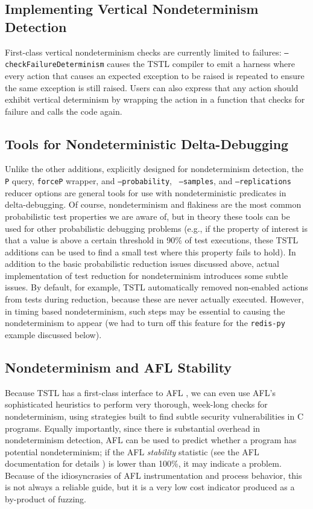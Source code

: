 \subsection{Implementing Vertical Nondeterminism Detection}

First-class vertical nondeterminism checks are currently
limited to failures:  {\tt --checkFailureDeterminism} causes the TSTL
compiler to emit a harness where every action that causes an expected
exception to be raised is repeated to ensure the same exception is
still raised.  Users can also express that any action should exhibit
vertical determinism by wrapping the action in a function that checks
for failure and calls the code again.

\subsection{Tools for Nondeterministic Delta-Debugging}

Unlike the other additions, explicitly designed for nondeterminism
detection, the {\tt P} query, {\tt forceP} wrapper, and {\tt --probability}, {\tt
  --samples}, and {\tt --replications} reducer options are general
tools for use with nondeterministic predicates in delta-debugging.  Of
course, nondeterminism and flakiness are the most common probabilistic
test properties we are aware of, but in theory these tools can be used
for other probabilistic debugging problems (e.g., if the property of
interest is that a value is above a certain threshold in 90\% of test
executions, these TSTL additions can be used to find a small test where this property
fails to hold).  In addition to the basic probabilistic reduction
issues discussed above, actual implementation of test reduction for
nondeterminism introduces some subtle issues.  By default, for
example, TSTL automatically removed non-enabled actions from tests
during reduction, because these are never actually executed.  However,
in timing based nondeterminism, such steps may be essential to
causing the nondeterminism to appear (we had to turn off this feature
for the {\tt redis-py} example discussed below).

\subsection{Nondeterminism and AFL Stability}

Because TSTL has a first-class interface to AFL \cite{aflfuzz}, we can even use
AFL's sophisticated heuristics to perform very thorough, week-long
checks for nondeterminism, using strategies built to find subtle
security vulnerabilities in C programs.  Equally importantly, since
there is substantial overhead in nondeterminism detection, AFL can be
used to predict whether a program has potential nondeterminism; if the
AFL \emph{stability} statistic (see the AFL documentation for details
\cite{aflfuzz}) is lower than 100\%, it may indicate a problem.
Because of the idiosyncrasies of AFL instrumentation and process
behavior, this is not always a reliable guide, but it is a very low
cost indicator produced as a by-product of fuzzing.

